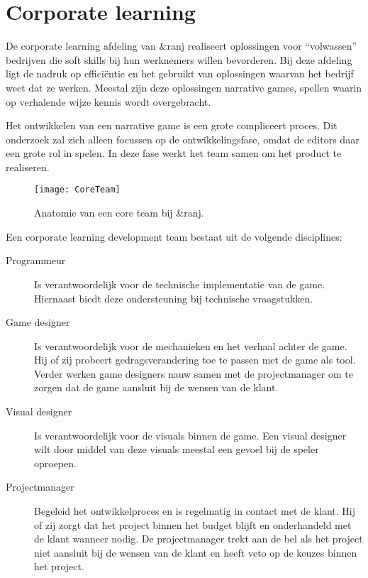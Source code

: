 \section{Corporate learning}
\label{sec:corporatelearningafdeling}
De corporate learning afdeling van \&ranj realiseert oplossingen voor “volwassen” bedrijven die soft skills bij hun werknemers willen bevorderen. Bij deze afdeling ligt de nadruk op efficiëntie en het gebruikt van oplossingen waarvan het bedrijf weet dat ze werken. Meestal zijn deze oplossingen narrative games, spellen waarin op verhalende wijze kennis wordt overgebracht.

Het ontwikkelen van een narrative game is een grote compliceert proces. Dit onderzoek zal zich alleen focussen op de ontwikkelingsfase, omdat de editors daar een grote rol in spelen. In deze fase werkt het team samen om het product te realiseren.

\begin{wrapfigure}{r}{0.45\textwidth}
    \texttt{[image: CoreTeam]}
    \caption{Anatomie van een core team bij \&ranj.}
    \label{fig:coreteam}
    \centering
\end{wrapfigure}

Een corporate learning development team bestaat uit de volgende disciplines:

\begin{description}
    \item[Programmeur] Is verantwoordelijk voor de technische implementatie van de game. Hiernaast biedt deze ondersteuning bij technische vraagstukken. 
    \item[Game designer] Is verantwoordelijk voor de mechanieken en het verhaal achter de game. Hij of zij probeert gedragsverandering toe te passen met de game als tool. Verder werken game designers nauw samen met de projectmanager om te zorgen dat de game aansluit bij de wensen van de klant.
    \item[Visual designer] Is verantwoordelijk voor de visuals binnen de game. Een visual designer wilt door middel van deze visuals meestal een gevoel bij de speler oproepen.
    \item[Projectmanager] Begeleid het ontwikkelproces en is regelmatig in contact met de klant. Hij of zij zorgt dat het project binnen het budget blijft en onderhandeld met de klant wanneer nodig. De projectmanager trekt aan de bel als het project niet aansluit bij de wensen van de klant en heeft veto op de keuzes binnen het project.    
\end{description}

